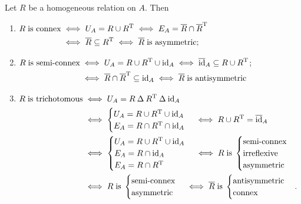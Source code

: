 \begin{lemma} \label{connexityEquivalents}
Let $R$ be a homogeneous relation on $A$. Then
\begin{enumerate}
\item $\begin{aligned}[t]
R \;\text{is connex} &\iff U_A = R\cup R^{\mathrm{T}} \iff E_A = \overline{R}\cap \overline{R}^{\mathrm{T}}\\
&\iff \overline{R}\subseteq R^{\mathrm{T}} \iff \overline{R}\; \text{is asymmetric};
\end{aligned}$
\item $\begin{aligned}[t]
R\; \text{is semi-connex} &\iff U_A = R\cup R^{\mathrm{T}} \cup \operatorname{id}_A \iff \overline{\operatorname{id}}_A\subseteq R\cup R^{\mathrm{T}} \\
&\iff \overline{R}\cap \overline{R}^{\mathrm{T}} \subseteq \operatorname{id}_A \iff \overline{R}\; \text{is antisymmetric}
\end{aligned}$;
\item $\begin{aligned}[t]
R\; \text{is trichotomous} &\iff U_A = R\mathbin{\Delta} R^{\mathrm{T}} \mathbin{\Delta} \operatorname{id}_A \\
&\iff \begin{cases}
U_A = R\cup R^{\mathrm{T}} \cup \operatorname{id}_A \\
E_A = R\cap R^{\mathrm{T}} \cap \operatorname{id}_A
\end{cases} \iff R\cup R^{\mathrm{T}} = \overline{\operatorname{id}}_A \\
&\iff \begin{cases}
U_A = R\cup R^{\mathrm{T}} \cup \operatorname{id}_A \\
E_A = R\cap \operatorname{id}_A \\
E_A = R \cap R^{\mathrm{T}}
\end{cases} \iff R \; \text{is}\;\begin{cases}
\text{semi-connex} \\ \text{irreflexive} \\ \text{asymmetric}
\end{cases} \\
&\iff R \; \text{is}\;\begin{cases}
\text{semi-connex} \\ \text{asymmetric}
\end{cases} \iff \overline{R} \; \text{is}\;\begin{cases}
\text{antisymmetric} \\ \text{connex}
\end{cases}.
\end{aligned}$
\end{enumerate}
\end{lemma}

